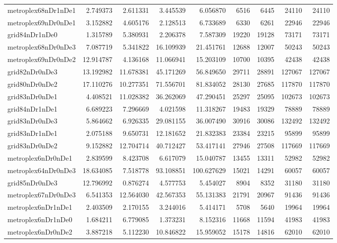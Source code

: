 \begin{longtable}{|l|r|r|r|r|r|r|r|r|}
metroplex68nDr1nDe1 & 2.749373 & 2.611331 & 3.445539 & 6.056870 & 6516 & 6445 & 24110 & 24110 \\
metroplex69nDr0nDe1 & 3.152882 & 4.605176 & 2.128513 & 6.733689 & 6330 & 6261 & 22946 & 22946 \\
grid84nDr1nDe0 & 1.315789 & 5.380931 & 2.206378 & 7.587309 & 19220 & 19128 & 73171 & 73171 \\
metroplex68nDr0nDe3 & 7.087719 & 5.341822 & 16.109939 & 21.451761 & 12688 & 12007 & 50243 & 50243 \\
metroplex69nDr0nDe2 & 12.914787 & 4.136168 & 11.066941 & 15.203109 & 10700 & 10395 & 42438 & 42438 \\
grid82nDr0nDe3 & 13.192982 & 11.678381 & 45.171269 & 56.849650 & 29711 & 28891 & 127067 & 127067 \\
grid80nDr0nDe2 & 17.110276 & 10.277351 & 71.556701 & 81.834052 & 28130 & 27685 & 117870 & 117870 \\
grid83nDr0nDe1 & 4.408521 & 11.028382 & 36.262069 & 47.290451 & 25297 & 25095 & 102673 & 102673 \\
grid84nDr1nDe1 & 6.689223 & 7.296669 & 4.021598 & 11.318267 & 19483 & 19329 & 78889 & 78889 \\
grid83nDr0nDe3 & 5.864662 & 6.926335 & 29.081155 & 36.007490 & 30916 & 30086 & 132492 & 132492 \\
grid83nDr1nDe1 & 2.075188 & 9.650731 & 12.181652 & 21.832383 & 23384 & 23215 & 95899 & 95899 \\
grid83nDr0nDe2 & 9.152882 & 12.704714 & 40.712427 & 53.417141 & 27946 & 27508 & 117669 & 117669 \\
metroplex6nDr0nDe1 & 2.839599 & 8.423708 & 6.617079 & 15.040787 & 13455 & 13311 & 52982 & 52982 \\
metroplex64nDr0nDe3 & 18.634085 & 7.518778 & 93.108851 & 100.627629 & 15021 & 14291 & 60057 & 60057 \\
grid85nDr0nDe3 & 12.796992 & 0.876274 & 4.577753 & 5.454027 & 8904 & 8352 & 31180 & 31180 \\
metroplex67nDr0nDe3 & 6.541353 & 12.564030 & 42.567353 & 55.131383 & 21791 & 20967 & 91436 & 91436 \\
metroplex6nDr1nDe1 & 2.403509 & 2.170155 & 3.244016 & 5.414171 & 5708 & 5640 & 19964 & 19964 \\
metroplex6nDr1nDe0 & 1.684211 & 6.779085 & 1.373231 & 8.152316 & 11668 & 11594 & 41983 & 41983 \\
metroplex6nDr0nDe2 & 3.887218 & 5.112230 & 10.846822 & 15.959052 & 15178 & 14816 & 62010 & 62010 \\

\end{longtable}
